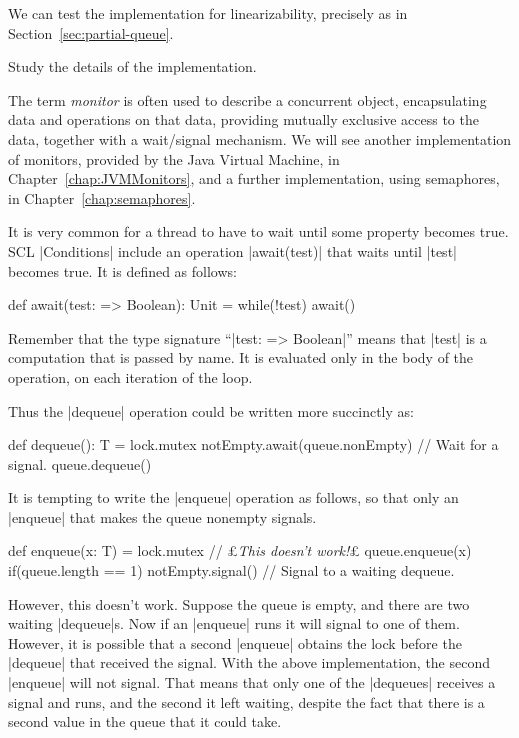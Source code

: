 
We can test the implementation for linearizability, precisely as in
Section~\ref{sec:partial-queue}. 

\begin{instruction}
Study the details of the implementation. 
\end{instruction}

The term \emph{monitor} is often used to describe a concurrent
object, encapsulating data and operations on that data, providing mutually
exclusive access to the data, together with a wait/signal mechanism.  We will
see another implementation of monitors, provided by the Java Virtual Machine,
in Chapter~\ref{chap:JVMMonitors}, and a further implementation, using
semaphores, in Chapter~\ref{chap:semaphores}.

It is very common for a thread to have to wait until some property becomes
true.  SCL |Conditions| include an operation |await(test)|
that waits until |test| becomes true.  It is defined as follows:
%
\begin{scala}
  def await(test: => Boolean): Unit = while(!test) await()
\end{scala}
%
Remember that the type signature ``|test: => Boolean|'' means that |test| is a
computation that is passed by name.  It is evaluated only in the body of the
operation, on each iteration of the loop.

Thus the |dequeue| operation could be written more succinctly as:
\begin{scala}
  def dequeue(): T = lock.mutex{
    notEmpty.await(queue.nonEmpty) // Wait for a signal.
    queue.dequeue()
  }
\end{scala}

It is tempting to write the |enqueue| operation as follows, so that only an
|enqueue| that makes the queue nonempty signals.
%
\begin{scala}
  def enqueue(x: T) = lock.mutex{ // £\emph{This doesn't work!}£
    queue.enqueue(x)
    if(queue.length == 1) notEmpty.signal() // Signal to a waiting dequeue.
  } 
\end{scala}
%
However, this doesn't work.  Suppose the queue is empty, and there are two
waiting |dequeue|s.  Now if an |enqueue| runs it will signal to one of them.
However, it is possible that a second |enqueue| obtains the lock before the
|dequeue| that received the signal.  With the above implementation, the second
|enqueue| will not signal.  That means that only one of the |dequeues|
receives a signal and runs, and the second it left waiting, despite the fact
that there is a second value in the queue that it could take. 


